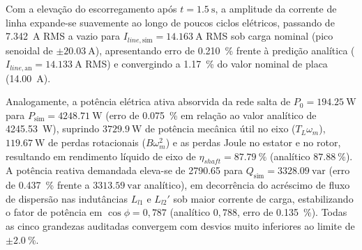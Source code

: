 Com a elevação do escorregamento após $t = \SI{1,5}{\second}$, a amplitude da corrente de linha expande-se suavemente ao longo de poucos ciclos elétricos, passando de \SI{7,342}{\ampere} RMS a vazio para $I_{line,\text{sim}} = \SI{14,163}{\ampere}$ RMS sob carga nominal (pico senoidal de $\pm \SI{20,03}{\ampere}$), apresentando erro de \SI{0,210}{\percent} frente à predição analítica ($I_{line,\text{an}} = \SI{14,133}{\ampere}$ RMS) e convergindo a \SI{1,17}{\percent} do valor nominal de placa (\SI{14,00}{\ampere}).

Analogamente, a potência elétrica ativa absorvida da rede salta de $P_0 = \SI{194,25}{\watt}$ para $P_{\text{sim}} = \SI{4248,71}{\watt}$ (erro de \SI{0,075}{\percent} em relação ao valor analítico de \SI{4245,53}{\watt}), suprindo $\SI{3729,9}{\watt}$ de potência mecânica útil no eixo ($T_L \omega_m$), $\SI{119,67}{\watt}$ de perdas rotacionais ($B\omega_m^2$) e as perdas Joule no estator e no rotor, resultando em rendimento líquido de eixo de $\eta_{shaft} = \SI{87,79}{\percent}$ (analítico $\SI{87,88}{\percent}$). A potência reativa demandada eleva-se de \SI{2790,65}{} para $Q_{\text{sim}} = \SI{3328,09}{\text{var}}$ (erro de \SI{0,437}{\percent} frente a $\SI{3313,59}{\text{var}}$ analítico), em decorrência do acréscimo de fluxo de dispersão nas indutâncias $L_{l1}$ e $L_{l2}'$ sob maior corrente de carga, estabilizando o fator de potência em $\cos\phi = 0{,}787$ (analítico $0{,}788$, erro de \SI{0,135}{\percent}). Todas as cinco grandezas auditadas convergem com desvios muito inferiores ao limite de $\pm \SI{2,0}{\percent}$.
